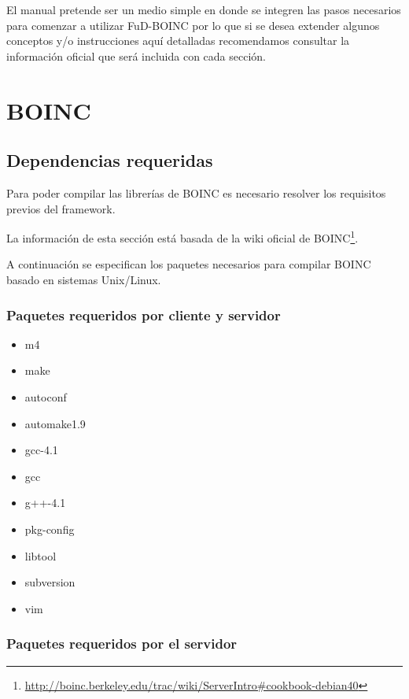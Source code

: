 \documentclass[12pt,spanish,a4paper]{report}
\begin{document}
El manual pretende ser un medio simple en donde se integren las pasos necesarios para comenzar a utilizar FuD-BOINC por lo que si se desea extender algunos conceptos y/o instrucciones aquí detalladas recomendamos consultar la información oficial que será incluida con cada sección.



\chapter{BOINC}


\section{Dependencias requeridas}
\label{boinc:dependencias}

Para poder compilar las librerías de BOINC es necesario resolver los requisitos previos del framework.

La información de esta sección está basada de la wiki oficial de BOINC\footnote{\url{http://boinc.berkeley.edu/trac/wiki/ServerIntro\#cookbook-debian40}}.

A continuación se especifican los paquetes necesarios para compilar BOINC basado en sistemas Unix/Linux.

\subsection{Paquetes requeridos por cliente y servidor}

\begin{itemize}
\item m4 
\item make \item autoconf \item automake1.9 \item gcc-4.1 \item gcc \item g++-4.1 \item pkg-config \item libtool \item subversion \item vim
\end{itemize}

\subsection{Paquetes requeridos por el servidor}
\end{document}
